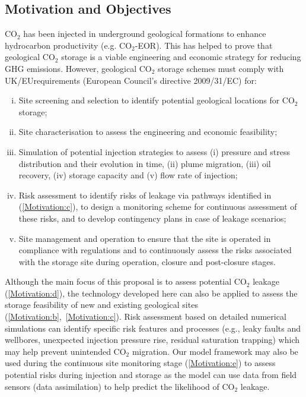 \documentclass[12pts,a4paper,amsmath,amssymb,floatfix]{article}%
\newcommand{\CO}{CO\ensuremath{_{2}}}
\begin{document}
\subsection{Motivation and Objectives}
\CO\; has been injected in underground geological formations to enhance hydrocarbon productivity (e.g. \CO-EOR). %
This has helped to prove that geological \CO\; storage is a viable engineering and economic strategy for reducing GHG emissions. However, geological \CO\; storage schemes must comply with UK/EUrequirements (European Council's directive 2009/31/EC) for:
\begin{enumerate}[(i)]
%
   \item Site screening and selection to identify potential geological locations for \CO\; storage;\label{Motivation:a}
%
   \item Site characterisation to assess the engineering and economic feasibility;\label{Motivation:b}
%
   \item Simulation of potential injection strategies to assess (i) pressure and stress distribution and their evolution in time, (ii) plume migration, (iii) oil recovery, (iv) storage capacity and (v) flow rate of injection;\label{Motivation:c}
%
   \item Risk assessment to identify risks of leakage via pathways identified in (\ref{Motivation:c}), to design a monitoring scheme for continuous assessment of these risks, and to develop contingency plans in case of  leakage scenarios;\label{Motivation:d}
%
   \item Site management and operation to ensure that the site is operated in compliance with regulations and to continuously assess the risks associated with the storage site during operation, closure and post-closure stages.\label{Motivation:e} 
%
\end{enumerate}
 
Although the main focus of this proposal is to assess potential \CO\; leakage (\ref{Motivation:d}), the technology developed here can also be applied to assess the storage feasibility of new and existing geological sites (\ref{Motivation:b},~\ref{Motivation:c}).  Risk assessment based on detailed numerical simulations can identify specific risk features and processes (e.g., leaky faults and wellbores, unexpected injection pressure rise, residual saturation trapping) which may help prevent unintended \CO\; migration. Our model framework may also be used during the continuous site monitoring stage (\ref{Motivation:e}) to assess potential risks during injection and storage as the model can use data from field sensors (data assimilation) to help predict the likelihood of \CO\; leakage.
\end{document}
